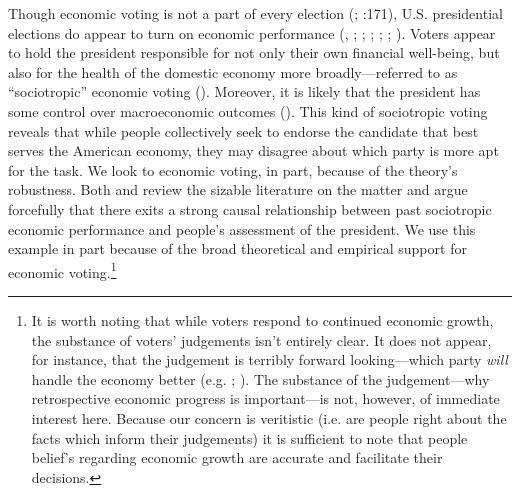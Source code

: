 \documentclass[11pt]{article}
\begin{document}
Though economic voting is not a part of every election (\citet{Stein:1990tt}; \cite{Nadeau:2001tw}:171), U.S. presidential elections do appear to turn on economic performance (\cite{miller1985throwing}, \cite{Fiorina:1978tz}; \cite{Lockerbie:1992js}; \cite{Lanoue:1994bl}; \cite{LewisBeck:2000ww}; \cite{Nadeau:2001tw}; \citet{Markus88}). Voters appear to hold the president responsible for not only their own financial well-being, but also for the health of the domestic economy more broadly---referred to as ``sociotropic'' economic voting  (\citet{Kinder1981}). Moreover, it is likely that the president has some control over macroeconomic outcomes (\cite{blinder2014presidents}). This kind of sociotropic voting reveals that while people collectively seek to endorse the candidate that best serves the American economy, they may disagree about which party is more apt for the task. We look to economic voting, in part, because of the theory's robustness. Both \cite{Duch2008} and \cite{Revisited09} review the sizable literature on the matter and argue forcefully that there exits a strong causal relationship between past sociotropic economic performance and people's assessment of the president. We use this example in part because of the broad theoretical and empirical support for economic voting.\footnote{It is worth noting that while voters respond to continued economic growth, the substance of voters' judgements isn't entirely clear. It does not appear, for instance, that the judgement is terribly forward looking---which party \emph{will} handle the economy better (e.g. \cite{Nadeau:2001tw}; \cite{woon2012democratic}). The substance of the judgement---why retrospective economic progress is important---is not, however, of immediate interest here. Because our concern is veritistic (i.e. are people right about the facts which inform their judgements) it is sufficient to note that people belief's regarding economic growth are accurate and facilitate their decisions.} 
\end{document}
